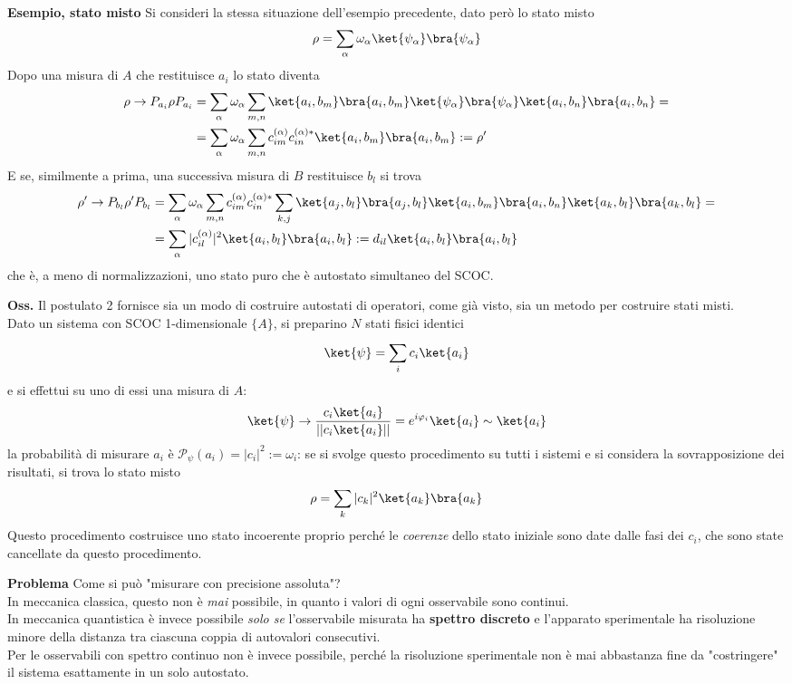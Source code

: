 \textbf{Esempio, stato misto} Si consideri la stessa situazione dell'esempio precedente, dato però lo
stato misto
$$\rho = \sum_{\alpha}\omega_\alpha\ket{\psi_\alpha}\bra{\psi_\alpha}$$
Dopo una misura di $A$ che restituisce $a_i$ lo stato diventa
\begin{align*}
    \rho\rightarrow P_{a_i}\rho P_{a_i}&=
    \sum_{\alpha}\omega_\alpha\sum_{m,n}\ket{a_i,b_m}\bra{a_i,b_m}\ket{\psi_\alpha}\bra{\psi_\alpha}
    \ket{a_i,b_n}\bra{a_i,b_n}=\\
    &=\sum_{\alpha}\omega_\alpha\sum_{m,n} c_{im}^{(\alpha)}c_{in}^{(\alpha)*}\ket{a_i,b_m}\bra{a_i,b_m}:=
    \rho'
\end{align*}
E se, similmente a prima, una successiva misura di $B$ restituisce $b_l$ si trova
\begin{align*}
    \rho'\rightarrow P_{b_l}\rho'P_{b_l} &=
    \sum_{\alpha}\omega_\alpha\sum_{m,n} c_{im}^{(\alpha)}c_{in}^{(\alpha)*}\sum_{k,j}\ket{a_j,b_l}
    \bra{a_j,b_l}\ket{a_i,b_m}\bra{a_i,b_n}\ket{a_k,b_l}\bra{a_k,b_l} =\\
    &= \sum_{\alpha} |c_{il}^{(\alpha)}|^2\ket{a_i,b_l}\bra{a_i,b_l}
    := d_{il}\ket{a_i,b_l}\bra{a_i,b_l}
\end{align*}
che è, a meno di normalizzazioni, uno stato puro che è autostato simultaneo del SCOC.

\textbf{Oss.} Il postulato 2 fornisce sia un modo di costruire autostati di operatori, come già visto, sia
un metodo per costruire stati misti.\\
Dato un sistema con SCOC 1-dimensionale $\{A\}$,
si preparino $N$ stati fisici identici 
$$\ket{\psi} = \sum_{i}^{}c_i\ket{a_i}$$
e si effettui su uno di essi una misura di $A$:
$$\ket{\psi}\rightarrow \frac{c_i\ket{a_i}}{||c_i\ket{a_i}||} = e^{i\varphi_i}\ket{a_i}\sim\ket{a_i}$$
la probabilità di misurare $a_i$ è $\mathcal{P}_{\psi}(a_i)=|c_i|^2:=\omega_i$: se si svolge questo
procedimento su tutti i sistemi e si considera la sovrapposizione dei risultati, si trova lo stato misto
$$\rho = \sum_{k}|c_k|^2\ket{a_k}\bra{a_k}$$
Questo procedimento costruisce uno stato incoerente proprio perché le \textit{coerenze} dello stato
iniziale sono date dalle fasi dei $c_i$, che sono state cancellate da questo procedimento.

\textbf{Problema} Come si può "misurare con precisione assoluta"?\\
In meccanica classica, questo non è \textit{mai} possibile, in quanto i valori di ogni osservabile sono
continui.\\
In meccanica quantistica è invece possibile \textit{solo se} l'osservabile misurata ha
\textbf{spettro discreto} e l'apparato sperimentale ha risoluzione minore della distanza tra ciascuna 
coppia di autovalori consecutivi.\\
Per le osservabili con spettro continuo non è invece possibile, perché la risoluzione sperimentale non è
mai abbastanza fine da "costringere" il sistema esattamente in un solo autostato.

